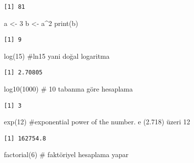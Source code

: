 \documentclass[
  letterpaper,
  DIV=11,
  numbers=noendperiod]{scrreprt}
\newenvironment{Shaded}{\begin{snugshade}}{\end{snugshade}}
\newcommand{\CommentTok}[1]{\textcolor[rgb]{0.37,0.37,0.37}{#1}}
\newcommand{\DecValTok}[1]{\textcolor[rgb]{0.68,0.00,0.00}{#1}}
\newcommand{\FunctionTok}[1]{\textcolor[rgb]{0.28,0.35,0.67}{#1}}
\newcommand{\NormalTok}[1]{\textcolor[rgb]{0.00,0.23,0.31}{#1}}
\newcommand{\OtherTok}[1]{\textcolor[rgb]{0.00,0.23,0.31}{#1}}
\newcommand{\SpecialCharTok}[1]{\textcolor[rgb]{0.37,0.37,0.37}{#1}}
\begin{document}
\begin{verbatim}
[1] 81
\end{verbatim}

\begin{Shaded}
\begin{Highlighting}[]
\NormalTok{a }\OtherTok{\textless{}{-}}  \DecValTok{3} 
\NormalTok{b }\OtherTok{\textless{}{-}}\NormalTok{  a}\SpecialCharTok{\^{}}\DecValTok{2} 
\FunctionTok{print}\NormalTok{(b) }
\end{Highlighting}
\end{Shaded}

\begin{verbatim}
[1] 9
\end{verbatim}

\begin{Shaded}
\begin{Highlighting}[]
\FunctionTok{log}\NormalTok{(}\DecValTok{15}\NormalTok{) }\CommentTok{\#ln15 yani doğal logaritma }
\end{Highlighting}
\end{Shaded}

\begin{verbatim}
[1] 2.70805
\end{verbatim}

\begin{Shaded}
\begin{Highlighting}[]
\FunctionTok{log10}\NormalTok{(}\DecValTok{1000}\NormalTok{) }\CommentTok{\# 10 tabanına göre hesaplama }
\end{Highlighting}
\end{Shaded}

\begin{verbatim}
[1] 3
\end{verbatim}

\begin{Shaded}
\begin{Highlighting}[]
\FunctionTok{exp}\NormalTok{(}\DecValTok{12}\NormalTok{) }\CommentTok{\#exponential power of the number. e (2.718) üzeri 12 }
\end{Highlighting}
\end{Shaded}

\begin{verbatim}
[1] 162754.8
\end{verbatim}

\begin{Shaded}
\begin{Highlighting}[]
\FunctionTok{factorial}\NormalTok{(}\DecValTok{6}\NormalTok{) }\CommentTok{\# faktöriyel hesaplama yapar }
\end{Highlighting}
\end{Shaded}
\end{document}
